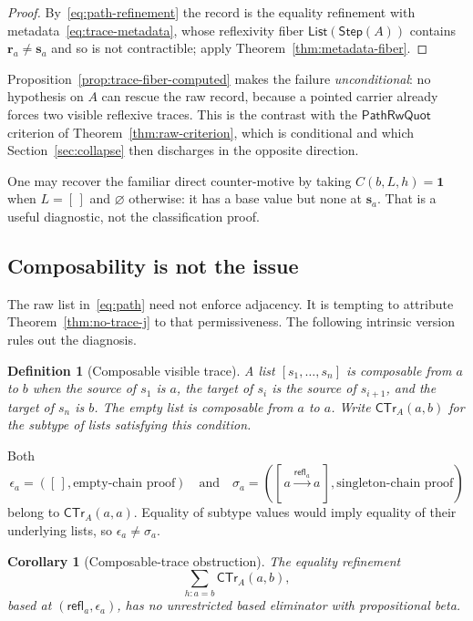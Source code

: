 \documentclass[10pt,reqno]{amsart}
\newtheorem{corollary}[theorem]{Corollary}
\newtheorem{definition}[theorem]{Definition}
\newcommand{\Step}{\mathsf{Step}}
\newcommand{\refl}{\mathsf{refl}}
\newcommand{\List}{\mathsf{List}}
\newcommand{\Unit}{\mathbf 1}
\newcommand{\Empty}{[\,]}
\newcommand{\PRW}{\mathsf{PathRwQuot}}
\begin{document}
\begin{proof}
By~\eqref{eq:path-refinement} the record is the equality refinement with
metadata~\eqref{eq:trace-metadata}, whose reflexivity fiber
\(\List(\Step(A))\) contains \(\mathbf r_a\ne\mathbf s_a\) and so is not
contractible; apply Theorem~\ref{thm:metadata-fiber}.
\end{proof}

Proposition~\ref{prop:trace-fiber-computed} makes the failure
\emph{unconditional}: no hypothesis on \(A\) can rescue the raw record, because
a pointed carrier already forces two visible reflexive traces.  This is the
contrast with the \(\PRW\) criterion of Theorem~\ref{thm:raw-criterion}, which
is conditional and which Section~\ref{sec:collapse} then discharges in the
opposite direction.

One may recover the familiar direct counter-motive by taking \(C(b,L,h)=\Unit\)
when \(L=\Empty\) and \(\varnothing\) otherwise: it has a base value but none at
\(\mathbf s_a\).  That is a useful diagnostic, not the classification proof.

\subsection{Composability is not the issue}

The raw list in~\eqref{eq:path} need not enforce adjacency.  It is tempting to
attribute Theorem~\ref{thm:no-trace-j} to that permissiveness.  The following
intrinsic version rules out the diagnosis.

\begin{definition}[Composable visible trace]
\label{def:composable}
A list \([s_1,\ldots,s_n]\) is composable from \(a\) to \(b\) when the source
of \(s_1\) is \(a\), the target of \(s_i\) is the source of \(s_{i+1}\), and
the target of \(s_n\) is \(b\).  The empty list is composable from \(a\) to
\(a\).  Write \(\mathsf{CTr}_A(a,b)\) for the subtype of lists satisfying this
condition.
\end{definition}

Both
\[
      \epsilon_a=(\Empty,\text{empty-chain proof})
      \quad\text{and}\quad
      \sigma_a=([\,a\xrightarrow{\refl_a}a\,],
                   \text{singleton-chain proof})
\tag{9.7}\label{eq:composable-two}
\]
belong to \(\mathsf{CTr}_A(a,a)\).  Equality of subtype values would imply
equality of their underlying lists, so \(\epsilon_a\ne\sigma_a\).

\begin{corollary}[Composable-trace obstruction]
\label{cor:composable}
The equality refinement
\[
   \sum_{h:a=b}\mathsf{CTr}_A(a,b),
\tag{9.8}\label{eq:composable-refinement}
\]
based at \((\refl_a,\epsilon_a)\), has no unrestricted based eliminator with
propositional beta.
\end{corollary}
\end{document}
